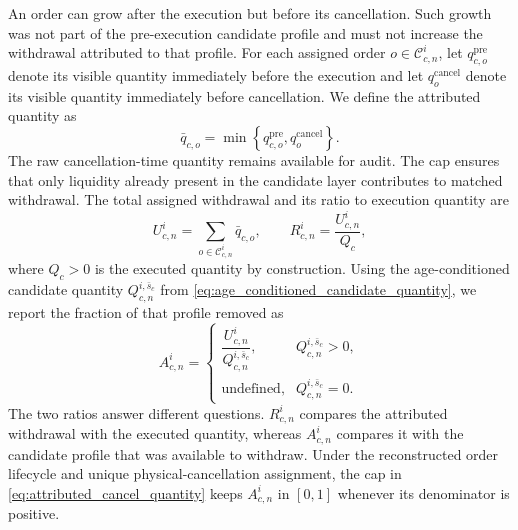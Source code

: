 \documentclass[11pt]{article}
\begin{document}
An order can grow after the execution but before its cancellation. Such growth was not part of the pre-execution candidate
profile and must not increase the withdrawal attributed to that profile. For each assigned order
$o\in\mathcal{C}_{c,n}^{i}$, let $q^{\mathrm{pre}}_{c,o}$ denote its visible quantity immediately before the execution and let
$q^{\mathrm{cancel}}_o$ denote its visible quantity immediately before cancellation. We define the attributed quantity as
\begin{equation}
    \bar q_{c,o}
    =
    \min\!\left\{q^{\mathrm{pre}}_{c,o},q^{\mathrm{cancel}}_o\right\}.
    \label{eq:attributed_cancel_quantity}
\end{equation}
The raw cancellation-time quantity remains available for audit. The cap ensures that only liquidity already present in the
candidate layer contributes to matched withdrawal. The total assigned withdrawal and its ratio to execution quantity are
\begin{equation}
    U^{i}_{c,n}=\sum_{o\in\mathcal{C}_{c,n}^{i}}\bar q_{c,o},
    \qquad
    R^{i}_{c,n}=\frac{U^{i}_{c,n}}{Q_c},
    \label{eq:assigned_withdrawal}
\end{equation}
where $Q_c>0$ is the executed quantity by construction. Using the age-conditioned candidate quantity
$Q^{i,\bar{s}_c}_{c,n}$ from \cref{eq:age_conditioned_candidate_quantity}, we report the fraction of that profile removed as
\begin{equation}
    A^{i}_{c,n}
    =\begin{cases}
    \dfrac{U^{i}_{c,n}}{Q^{i,\bar{s}_c}_{c,n}},
    & Q^{i,\bar{s}_c}_{c,n}>0,\\
    \text{undefined},
    & Q^{i,\bar{s}_c}_{c,n}=0.
    \end{cases}
    \label{eq:assigned_withdrawal_share}
\end{equation}
The two ratios answer different questions. $R^{i}_{c,n}$ compares the attributed withdrawal with the executed quantity,
whereas $A^{i}_{c,n}$ compares it with the candidate profile that was available to withdraw. Under the reconstructed order
lifecycle and unique physical-cancellation assignment, the cap in \cref{eq:attributed_cancel_quantity} keeps
$A^{i}_{c,n}$ in $[0,1]$ whenever its denominator is positive.
\end{document}
